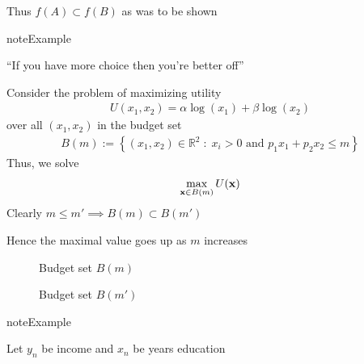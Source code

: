\documentclass[letterpaper,10pt,english]{jupyterBook}
\begin{document}
\sphinxAtStartPar
Thus \(f(A) \subset f(B)\) as was to be shown

\begin{sphinxadmonition}{note}{Example}

\sphinxAtStartPar
“If you have more choice then you’re better off”
\end{sphinxadmonition}

\sphinxAtStartPar
Consider the problem of maximizing utility
\begin{equation*}
\begin{split}
%
U(x_1, x_2) = \alpha \log(x_1) + \beta \log(x_2)
%
\end{split}
\end{equation*}
\sphinxAtStartPar
over all \((x_1, x_2)\) in the budget set
\begin{equation*}
\begin{split}
%
B(m) 
:= \left\{ 
(x_1, x_2) \in \mathbb{R}^2
\;:\;
x_i > 0 \text{ and } p_1 x_1 + p_2 x_2 \leq m
\right\}
%
\end{split}
\end{equation*}
\sphinxAtStartPar
Thus, we solve
\begin{equation*}
\begin{split}
%
\max_{{\bf x} \in B(m)} U({\bf x})
%
\end{split}
\end{equation*}
\sphinxAtStartPar
Clearly \(m \leq m' \implies B(m) \subset B(m')\)

\sphinxAtStartPar
Hence the maximal value goes up as \(m\) increases

\begin{figure}[htbp]
\centering
\capstart

\noindent{}
\caption{Budget set \(B(m)\)}\label{\detokenize{06.optimization_fundamentals:id7}}\end{figure}

\begin{figure}[htbp]
\centering
\capstart

\noindent{}
\caption{Budget set \(B(m')\)}\label{\detokenize{06.optimization_fundamentals:id8}}\end{figure}

\begin{sphinxadmonition}{note}{Example}

\sphinxAtStartPar
Let \(y_n\) be income and \(x_n\) be years education
\end{sphinxadmonition}
\end{document}
